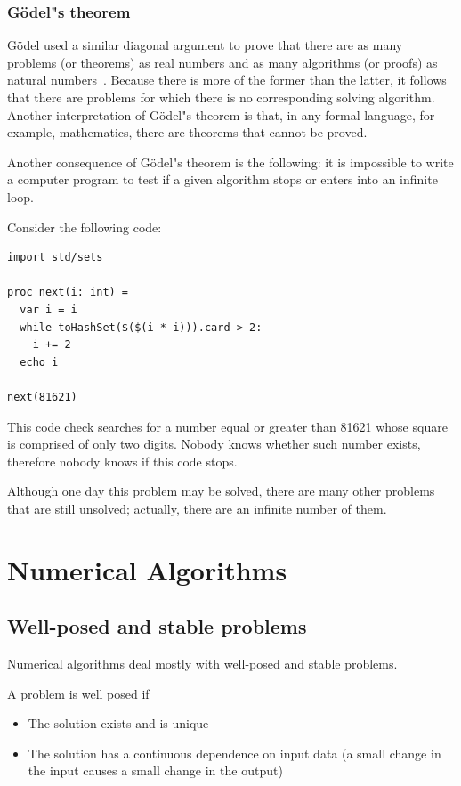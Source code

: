 \documentclass[justified, sixbynine]{tufte-book}
\theoremstyle{plain}%
\newtheorem * {corollary}{Corollary}
\theoremstyle{definition}
\theoremstyle{remark}
\newtheorem * {remark}{Remark}
\newtheorem * {note}{Note}
\begin{document}
\begin{fullwidth}
\subsection{G\"odel"s theorem}


G\"odel used a similar diagonal argument to prove that there are as many
problems (or theorems) as real numbers and as many algorithms (or proofs) as
natural numbers~\cite{hofstadter}. Because there is more of the former than the latter, it
follows that there are problems for which there is no corresponding solving
algorithm. Another interpretation of G\"odel"s theorem is that, in any formal
language, for example, mathematics, there are theorems that cannot be proved.

Another consequence of G\"odel"s theorem is the following:
it is impossible to write a computer program to test if a given algorithm
stops or enters into an infinite loop.

Consider the following code:

\begin{lstlisting}
import std/sets

proc next(i: int) =
  var i = i
  while toHashSet($($(i * i))).card > 2:
    i += 2
  echo i

next(81621)
\end{lstlisting}

This code check searches for a number equal or greater than 81621 whose square is comprised of only two digits. 
Nobody knows whether such number exists, therefore nobody knows if this code stops.

Although one day this problem may be solved, there are many other problems that
are still unsolved; actually, there are an infinite number of them.

\chapter{Numerical Algorithms}

\goodbreak\section{Well-posed and stable problems}


Numerical algorithms deal mostly with well-posed and stable problems.

A problem is well posed if
\begin{itemize}
\item The solution exists and is unique
\item The solution has a continuous dependence on input data (a small change in the input causes a small change in the output)
\end{itemize}


\end{fullwidth}
\end{document}
